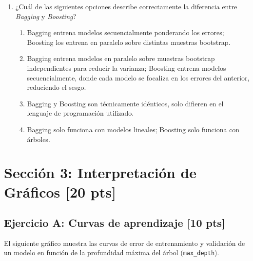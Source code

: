 \documentclass[11pt,a4paper]{article}
\newcommand{\puntaje}[1]{\textbf{[#1 pts]}}
\begin{document}
\begin{enumerate}[label=\textbf{\arabic*.}, leftmargin=*, itemsep=20pt]
\item ¿Cu\'al de las siguientes opciones describe correctamente la diferencia entre \textit{Bagging} y \textit{Boosting}?

\begin{enumerate}[label=\alph*)]
  \item Bagging entrena modelos secuencialmente ponderando los errores; Boosting los entrena en paralelo sobre distintas muestras bootstrap.
  \item Bagging entrena modelos en paralelo sobre muestras bootstrap independientes para reducir la varianza; Boosting entrena modelos secuencialmente, donde cada modelo se focaliza en los errores del anterior, reduciendo el sesgo.
  \item Bagging y Boosting son t\'ecnicamente id\'enticos, solo difieren en el lenguaje de programaci\'on utilizado.
  \item Bagging solo funciona con modelos lineales; Boosting solo funciona con \'arboles.
\end{enumerate}

\end{enumerate}

\vspace{0.5cm}

\section*{Secci\'on 3: Interpretaci\'on de Gr\'aficos \puntaje{20}}

\subsection*{Ejercicio A: Curvas de aprendizaje \puntaje{10}}

El siguiente gr\'afico muestra las curvas de error de entrenamiento y validaci\'on de un modelo en funci\'on de la profundidad m\'axima del \'arbol (\texttt{max\_depth}).

\vspace{0.3cm}
\begin{center}
\end{center}
\end{document}
